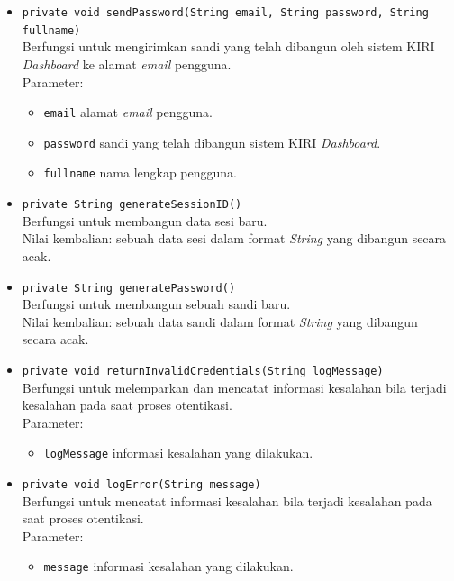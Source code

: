 \begin{itemize}
	\item \texttt{private void sendPassword(String email, String password, String fullname)}\\
	Berfungsi untuk mengirimkan sandi yang telah dibangun oleh sistem KIRI \textit{Dashboard} ke alamat \textit{email} pengguna.\\
	Parameter:
	\begin{itemize}
		\item \texttt{email} alamat \textit{email} pengguna.
		\item \texttt{password} sandi yang telah dibangun sistem KIRI \textit{Dashboard}.
		\item \texttt{fullname} nama lengkap pengguna.
	\end{itemize}
	\item \texttt{private String generateSessionID()}\\
	Berfungsi untuk membangun data sesi baru.\\
	Nilai kembalian: sebuah data sesi dalam format \textit{String} yang dibangun secara acak.
	\item \texttt{private String generatePassword()}\\
	Berfungsi untuk membangun sebuah sandi baru.\\
	Nilai kembalian: sebuah data sandi dalam format \textit{String} yang dibangun secara acak.
	\item \texttt{private void returnInvalidCredentials(String logMessage)}\\
	Berfungsi untuk melemparkan dan mencatat informasi kesalahan bila terjadi kesalahan pada saat proses otentikasi.\\
	Parameter:
	\begin{itemize}
		\item \texttt{logMessage} informasi kesalahan yang dilakukan.
	\end{itemize}
	\item \texttt{private void logError(String message)}\\
	Berfungsi untuk mencatat informasi kesalahan bila terjadi kesalahan pada saat proses otentikasi.\\
	Parameter:
	\begin{itemize}
		\item \texttt{message} informasi kesalahan yang dilakukan.
	\end{itemize}
\end{itemize}

